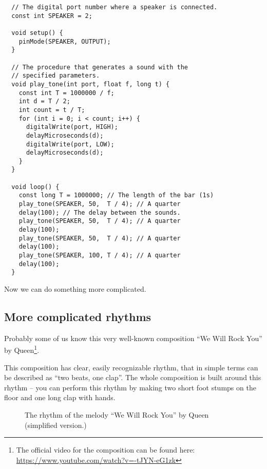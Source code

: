 \documentclass[../sparc.tex]{subfiles}
\begin{document}
\begin{verbatim}
  // The digital port number where a speaker is connected.
  const int SPEAKER = 2;

  void setup() {
    pinMode(SPEAKER, OUTPUT);
  }

  // The procedure that generates a sound with the
  // specified parameters.
  void play_tone(int port, float f, long t) {
    const int T = 1000000 / f;
    int d = T / 2;
    int count = t / T;
    for (int i = 0; i < count; i++) {
      digitalWrite(port, HIGH);
      delayMicroseconds(d);
      digitalWrite(port, LOW);
      delayMicroseconds(d);
    }
  }

  void loop() {
    const long T = 1000000; // The length of the bar (1s)
    play_tone(SPEAKER, 50,  T / 4); // A quarter
    delay(100); // The delay between the sounds.
    play_tone(SPEAKER, 50,  T / 4); // A quarter
    delay(100);
    play_tone(SPEAKER, 50,  T / 4); // A quarter
    delay(100);
    play_tone(SPEAKER, 100, T / 4); // A quarter
    delay(100);
  }
\end{verbatim}

Now we can do something more complicated.

\subsection{More complicated rhythms}

Probably some of us know this very well-known composition ``We Will Rock You''
by Queen\footnote{The official video for the composition can be found here:
\url{https://www.youtube.com/watch?v=-tJYN-eG1zk}}.

This composition has clear, easily recognizable rhythm, that in simple terms can
be described as ``two beats, one clap''.  The whole composition is built around
this rhythm -- you can perform this rhythm by making two short foot stumps on the
floor and one long clap with hands.

\begin{figure}[ht]
  \centering
  \caption{The rhythm of the melody ``We Will Rock You'' by Queen (simplified
    version.)}
  \label{fig:queen-we-will-rock-you-rhythm-1}
\end{figure}
\end{document}
